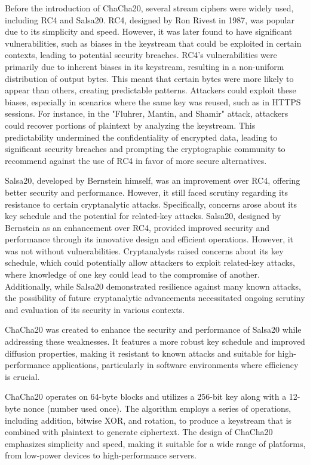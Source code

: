 \documentclass[a4paper,12pt]{report}
\begin{document}
Before the introduction of ChaCha20, several stream ciphers were widely used, including RC4 and Salsa20.
RC4, designed by Ron Rivest in 1987, was popular due to its simplicity and speed.
However, it was later found to have significant vulnerabilities, such as biases in the keystream that could be exploited in certain contexts, leading to potential security breaches.
RC4's vulnerabilities were primarily due to inherent biases in its keystream, resulting in a non-uniform distribution of output bytes.
This meant that certain bytes were more likely to appear than others, creating predictable patterns.
Attackers could exploit these biases, especially in scenarios where the same key was reused, such as in HTTPS sessions.
For instance, in the "Fluhrer, Mantin, and Shamir" attack, attackers could recover portions of plaintext by analyzing the keystream.
This predictability undermined the confidentiality of encrypted data, leading to significant security breaches and prompting the cryptographic community to recommend against the use of RC4 in favor of more secure alternatives.

Salsa20, developed by Bernstein himself, was an improvement over RC4, offering better security and performance.
However, it still faced scrutiny regarding its resistance to certain cryptanalytic attacks.
Specifically, concerns arose about its key schedule and the potential for related-key attacks.
Salsa20, designed by Bernstein as an enhancement over RC4, provided improved security and performance through its innovative design and efficient operations. However, it was not without vulnerabilities. Cryptanalysts raised concerns about its key schedule, which could potentially allow attackers to exploit related-key attacks, where knowledge of one key could lead to the compromise of another. Additionally, while Salsa20 demonstrated resilience against many known attacks, the possibility of future cryptanalytic advancements necessitated ongoing scrutiny and evaluation of its security in various contexts.

ChaCha20 was created to enhance the security and performance of Salsa20 while addressing these weaknesses.
It features a more robust key schedule and improved diffusion properties, making it resistant to known attacks and suitable for high-performance applications, particularly in software environments where efficiency is crucial.

ChaCha20 operates on 64-byte blocks and utilizes a 256-bit key along with a 12-byte nonce (number used once).
The algorithm employs a series of operations, including addition, bitwise XOR, and rotation, to produce a keystream that is combined with plaintext to generate ciphertext.
The design of ChaCha20 emphasizes simplicity and speed, making it suitable for a wide range of platforms, from low-power devices to high-performance servers.
\end{document}
